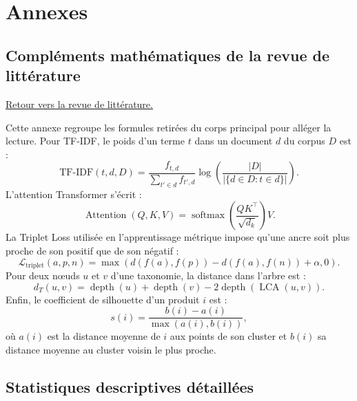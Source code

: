\documentclass[12pt,a4paper]{report}
\begin{document}
\cleardoublepage
{}
{} 
\appendix
\chapter*{Annexes}
\label{chap:annexes}


\section*{Compléments mathématiques de la revue de littérature}
\label{sec:literature-details-annex}

\noindent\hyperref[chap:literature-review]{Retour vers la revue de littérature.}

Cette annexe regroupe les formules retirées du corps principal pour alléger la lecture. Pour TF-IDF, le poids d'un terme $t$ dans un document $d$ du corpus $D$ est :
\begin{equation}
    \text{TF-IDF}(t,d,D)=\frac{f_{t,d}}{\sum_{t'\in d}f_{t',d}}\log\left(\frac{|D|}{|\{d\in D:t\in d\}|}\right).
\end{equation}
L'attention Transformer s'écrit :
\begin{equation}
    \operatorname{Attention}(Q,K,V)=\operatorname{softmax}\left(\frac{QK^\top}{\sqrt{d_k}}\right)V.
\end{equation}
La Triplet Loss utilisée en l'apprentissage métrique impose qu'une ancre soit plus proche de son positif que de son négatif :
\begin{equation}
    \mathcal{L}_{\text{triplet}}(a,p,n)=\max\left(d(f(a),f(p))-d(f(a),f(n))+\alpha,0\right).
\end{equation}
Pour deux nœuds $u$ et $v$ d'une taxonomie, la distance dans l'arbre est :
\begin{equation}
    d_T(u,v)=\operatorname{depth}(u)+\operatorname{depth}(v)-2\operatorname{depth}(\operatorname{LCA}(u,v)).
\end{equation}
Enfin, le coefficient de silhouette d'un produit $i$ est :
\begin{equation}
    s(i)=\frac{b(i)-a(i)}{\max(a(i),b(i))},
\end{equation}
où $a(i)$ est la distance moyenne de $i$ aux points de son cluster et $b(i)$ sa distance moyenne au cluster voisin le plus proche.

\section*{Statistiques descriptives détaillées}
\label{sec:data-detailed-annex}
\end{document}
